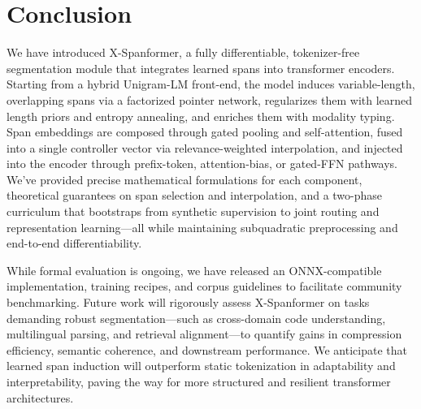 \section{Conclusion}

We have introduced X-Spanformer, a fully differentiable, tokenizer-free segmentation module that integrates learned spans into transformer encoders.  Starting from a hybrid Unigram-LM front-end, the model induces variable-length, overlapping spans via a factorized pointer network, regularizes them with learned length priors and entropy annealing, and enriches them with modality typing.  Span embeddings are composed through gated pooling and self-attention, fused into a single controller vector via relevance-weighted interpolation, and injected into the encoder through prefix-token, attention-bias, or gated-FFN pathways.  We’ve provided precise mathematical formulations for each component, theoretical guarantees on span selection and interpolation, and a two-phase curriculum that bootstraps from synthetic supervision to joint routing and representation learning—all while maintaining subquadratic preprocessing and end-to-end differentiability.

While formal evaluation is ongoing, we have released an ONNX-compatible implementation, training recipes, and corpus guidelines to facilitate community benchmarking.  Future work will rigorously assess X-Spanformer on tasks demanding robust segmentation—such as cross-domain code understanding, multilingual parsing, and retrieval alignment—to quantify gains in compression efficiency, semantic coherence, and downstream performance.  We anticipate that learned span induction will outperform static tokenization in adaptability and interpretability, paving the way for more structured and resilient transformer architectures.  